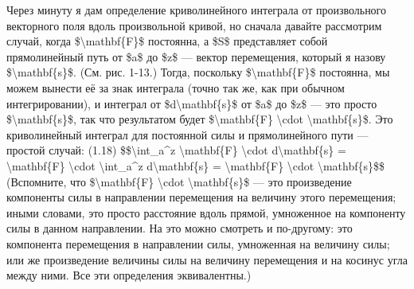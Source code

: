 \documentclass[10pt,oneside]{article}
\begin{document}
Через минуту я дам определение криволинейного интеграла от произвольного векторного поля вдоль произвольной кривой, но сначала давайте рассмотрим случай, когда \$\textbackslash{}mathbf\{F\}\$ постоянна, а \$S\$ представляет собой прямолинейный путь от \$a\$ до \$z\$ --- вектор перемещения, который я назову \$\textbackslash{}mathbf\{s\}\$. (См. рис. 1-13.) Тогда, поскольку \$\textbackslash{}mathbf\{F\}\$ постоянна, мы можем вынести её за знак интеграла (точно так же, как при обычном интегрировании), и интеграл от \$d\textbackslash{}mathbf\{s\}\$ от \$a\$ до \$z\$ --- это просто \$\textbackslash{}mathbf\{s\}\$, так что результатом будет \$\textbackslash{}mathbf\{F\} \textbackslash{}cdot \textbackslash{}mathbf\{s\}\$. Это криволинейный интеграл для постоянной силы и прямолинейного пути --- простой случай: (1.18) \$\$\textbackslash{}int\_a\textasciicircum{}z \textbackslash{}mathbf\{F\} \textbackslash{}cdot d\textbackslash{}mathbf\{s\} = \textbackslash{}mathbf\{F\} \textbackslash{}cdot \textbackslash{}int\_a\textasciicircum{}z d\textbackslash{}mathbf\{s\} = \textbackslash{}mathbf\{F\} \textbackslash{}cdot \textbackslash{}mathbf\{s\}\$\$ (Вспомните, что \$\textbackslash{}mathbf\{F\} \textbackslash{}cdot \textbackslash{}mathbf\{s\}\$ --- это произведение компоненты силы в направлении перемещения на величину этого перемещения; иными словами, это просто расстояние вдоль прямой, умноженное на компоненту силы в данном направлении. На это можно смотреть и по-другому: это компонента перемещения в направлении силы, умноженная на величину силы; или же произведение величины силы на величину перемещения и на косинус угла между ними. Все эти определения эквивалентны.)\par
\end{document}
